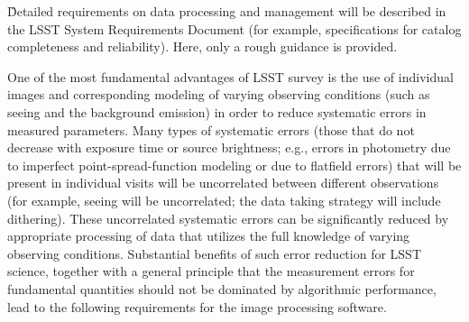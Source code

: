 \G{Detailed requirements on data processing and management will be described
in the LSST System Requirements Document (for example, specifications for catalog completeness
and reliability)}. Here, only a rough guidance is provided. 


One of the most fundamental advantages of LSST survey is the use of individual
images and corresponding modeling of varying observing conditions (such as seeing
and the background emission) in order to reduce systematic errors in measured
parameters.  Many types of systematic errors (those that do not decrease with
exposure time or source brightness; e.g., errors in photometry due to imperfect
point-spread-function modeling or due to flatfield errors) that will be present in
individual visits will be uncorrelated between different observations (for example,
seeing will be uncorrelated; the data taking strategy will include dithering). These
uncorrelated systematic errors can be significantly reduced by appropriate processing
of data that utilizes the full knowledge of varying observing conditions. Substantial
benefits of such error reduction for LSST science,  together with a general principle
that the measurement errors for fundamental quantities should not be dominated
by algorithmic performance, lead to the following requirements for the image
processing software.

